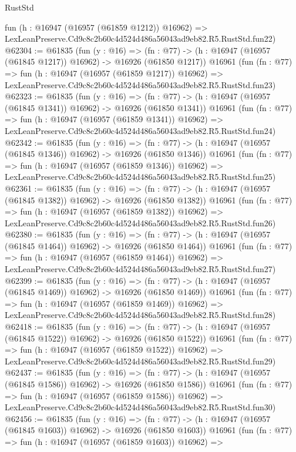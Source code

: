 \begin{lexlean}{RustStd}
\begin{coremodule}
    fun (h : @16947 (@16957 (@61859 @1212)) @16962) =>
    LexLeanPreserve.Cd9c8c2b60c4d524d486a56043ad9eb82.R5.RustStd.fun22)
@62304 := @61835
    (fun (y : @16) =>
    (fn : @77) -> (h : @16947 (@16957 (@61845 @1217)) @16962) -> @16926 (@61850 @1217))
    @16961
    (fun (fn : @77) =>
    fun (h : @16947 (@16957 (@61859 @1217)) @16962) =>
    LexLeanPreserve.Cd9c8c2b60c4d524d486a56043ad9eb82.R5.RustStd.fun23)
@62323 := @61835
    (fun (y : @16) =>
    (fn : @77) -> (h : @16947 (@16957 (@61845 @1341)) @16962) -> @16926 (@61850 @1341))
    @16961
    (fun (fn : @77) =>
    fun (h : @16947 (@16957 (@61859 @1341)) @16962) =>
    LexLeanPreserve.Cd9c8c2b60c4d524d486a56043ad9eb82.R5.RustStd.fun24)
@62342 := @61835
    (fun (y : @16) =>
    (fn : @77) -> (h : @16947 (@16957 (@61845 @1346)) @16962) -> @16926 (@61850 @1346))
    @16961
    (fun (fn : @77) =>
    fun (h : @16947 (@16957 (@61859 @1346)) @16962) =>
    LexLeanPreserve.Cd9c8c2b60c4d524d486a56043ad9eb82.R5.RustStd.fun25)
@62361 := @61835
    (fun (y : @16) =>
    (fn : @77) -> (h : @16947 (@16957 (@61845 @1382)) @16962) -> @16926 (@61850 @1382))
    @16961
    (fun (fn : @77) =>
    fun (h : @16947 (@16957 (@61859 @1382)) @16962) =>
    LexLeanPreserve.Cd9c8c2b60c4d524d486a56043ad9eb82.R5.RustStd.fun26)
@62380 := @61835
    (fun (y : @16) =>
    (fn : @77) -> (h : @16947 (@16957 (@61845 @1464)) @16962) -> @16926 (@61850 @1464))
    @16961
    (fun (fn : @77) =>
    fun (h : @16947 (@16957 (@61859 @1464)) @16962) =>
    LexLeanPreserve.Cd9c8c2b60c4d524d486a56043ad9eb82.R5.RustStd.fun27)
@62399 := @61835
    (fun (y : @16) =>
    (fn : @77) -> (h : @16947 (@16957 (@61845 @1469)) @16962) -> @16926 (@61850 @1469))
    @16961
    (fun (fn : @77) =>
    fun (h : @16947 (@16957 (@61859 @1469)) @16962) =>
    LexLeanPreserve.Cd9c8c2b60c4d524d486a56043ad9eb82.R5.RustStd.fun28)
@62418 := @61835
    (fun (y : @16) =>
    (fn : @77) -> (h : @16947 (@16957 (@61845 @1522)) @16962) -> @16926 (@61850 @1522))
    @16961
    (fun (fn : @77) =>
    fun (h : @16947 (@16957 (@61859 @1522)) @16962) =>
    LexLeanPreserve.Cd9c8c2b60c4d524d486a56043ad9eb82.R5.RustStd.fun29)
@62437 := @61835
    (fun (y : @16) =>
    (fn : @77) -> (h : @16947 (@16957 (@61845 @1586)) @16962) -> @16926 (@61850 @1586))
    @16961
    (fun (fn : @77) =>
    fun (h : @16947 (@16957 (@61859 @1586)) @16962) =>
    LexLeanPreserve.Cd9c8c2b60c4d524d486a56043ad9eb82.R5.RustStd.fun30)
@62456 := @61835
    (fun (y : @16) =>
    (fn : @77) -> (h : @16947 (@16957 (@61845 @1603)) @16962) -> @16926 (@61850 @1603))
    @16961
    (fun (fn : @77) =>
    fun (h : @16947 (@16957 (@61859 @1603)) @16962) =>

\end{coremodule}
\end{lexlean}
